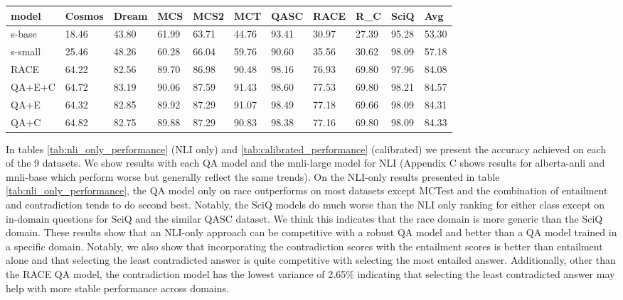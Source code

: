 \documentclass[11pt]{article}
\begin{document}
\begin{table*}[]
\centering
\begin{tabular}{lllllllllll}
\hline
model & Cosmos & Dream & MCS & MCS2 & MCT & QASC & RACE & R_C & SciQ & Avg \\ \hline
s-base & 18.46 & 43.80 & 61.99 & 63.71 & 44.76 & 93.41 & 30.97 & 27.39 & 95.28 & 53.30 \\
s-small & 25.46 & 48.26 & 60.28 & 66.04 & 59.76 & 90.60 & 35.56 & 30.62 & 98.09 & 57.18  \\
RACE & 64.22 & 82.56 & 89.70 & 86.98 & 90.48 & 98.16 & 76.93 & 69.80 & 97.96 & 84.08 \\
QA+E+C & 64.72 & 83.19 & 90.06 & 87.59 & 91.43 & 98.60 & 77.53 & 69.80 & 98.21 & 84.57 \\
QA+E & 64.32 & 82.85 & 89.92 & 87.29 & 91.07 & 98.49 & 77.18 & 69.66 & 98.09 & 84.31 \\
QA+C & 64.82 & 82.75 & 89.88 & 87.29 & 90.83 & 98.38 & 77.16 & 69.80 & 98.09 & 84.33 \\ \hline
\end{tabular}
\caption{Accuracy scores on calibrated NLI answer ranking. Calibrations are with the RoBERTa-RACE model. The best scores are bold and the second best are underlined.}
\label{tab:calibrated_performance}
\end{table*}
In tables \ref{tab:nli_only_performance} (NLI only) and \ref{tab:calibrated_performance} (calibrated) we present the accuracy achieved on each of the 9 datasets. We show results with each QA model and the mnli-large model for NLI (Appendix C shows results for alberta-anli and mnli-base which perform worse but generally reflect the same trends). On the NLI-only results presented in table \ref{tab:nli_only_performance}, the QA model only on race outperforms on most datasets except MCTest and the combination of entailment and contradiction tends to do second best. Notably, the SciQ models do much worse than the NLI only ranking for either class except on in-domain questions for SciQ and the similar QASC dataset. We think this indicates that the race domain is more generic than the SciQ domain. These results show that an NLI-only approach can be competitive with a robust QA model and better than a QA model trained in a specific domain. Notably, we also show that incorporating the contradiction scores with the entailment scores is better than entailment alone and that selecting the least contradicted answer is quite competitive with selecting the most entailed answer. Additionally, other than the RACE QA model, the contradiction model has the lowest variance of 2.65\% indicating that selecting the least contradicted answer may help with more stable performance across domains.
\end{document}
